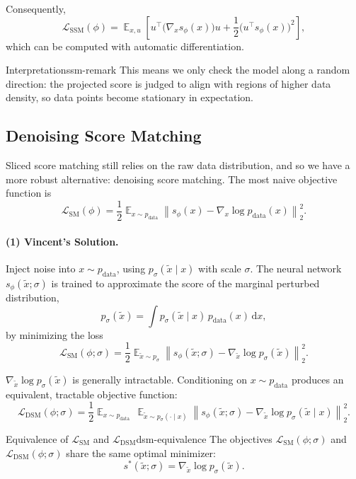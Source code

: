 \documentclass[11pt,a4paper]{article}
\newcommand{\wt}{\widetilde}
\renewcommand{\tilde}{\wt}
\renewcommand{\d}{\mathrm{d}}
\DeclareMathOperator*{\E}{\mathbb{E}}
\newcommand{\pdata}{p_{\mathrm{data}}}
\newcommand{\psigma}{p_{\sigma}}
\begin{document}
Consequently,
\[
\mathcal{L}_{\mathrm{SSM}}(\phi)
=
\E_{x,u}
\left[
u^\top\big(\nabla_x s_{\phi}(x)\big)u
+\frac12\big(u^\top s_{\phi}(x)\big)^2
\right],
\]
which can be computed with automatic differentiation.

\begin{remark}{Interpretation}{ssm-remark}
This means we only check the model along a random direction: the projected score is judged to align with regions of higher data density, so data points become stationary in expectation.
\end{remark}

\subsection{Denoising Score Matching}\label{subsec:dsm}

Sliced score matching still relies on the raw data distribution, and so we have a more robust alternative: denoising score matching. The most naive objective function is
\[
\mathcal{L}_{\mathrm{SM}}(\phi)
=\frac12 \E_{x\sim\pdata}
\left\|s_{\phi}(x)-\nabla_x\log \pdata(x)\right\|_2^2.
\]

\paragraph{(1) Vincent's Solution.}
Inject noise into $x\sim\pdata$, using $\psigma(\tilde x\mid x)$ with scale $\sigma$. The neural network $s_{\phi}(\tilde x;\sigma)$ is trained to approximate the score of the marginal perturbed distribution,
\[
\psigma(\tilde x)=\int \psigma(\tilde x\mid x)\,\pdata(x)\,\d x,
\]
by minimizing the loss
\[
\mathcal{L}_{\mathrm{SM}}(\phi;\sigma)
=\frac12\E_{\tilde x\sim\psigma}
\left\|s_{\phi}(\tilde x;\sigma)-\nabla_{\tilde x}\log\psigma(\tilde x)\right\|_2^2.
\]

$\nabla_{\tilde x}\log\psigma(\tilde x)$ is generally intractable. Conditioning on $x\sim\pdata$ produces an equivalent, tractable objective function:
\[
\mathcal{L}_{\mathrm{DSM}}(\phi;\sigma)
=\frac12\E_{x\sim\pdata}\,\E_{\tilde x\sim\psigma(\cdot\mid x)}
\left\|s_{\phi}(\tilde x;\sigma)-\nabla_{\tilde x}\log\psigma(\tilde x\mid x)\right\|_2^2.
\]

\begin{theorem}{Equivalence of $\mathcal{L}_{\mathrm{SM}}$ and $\mathcal{L}_{\mathrm{DSM}}$}{dsm-equivalence}
The objectives $\mathcal{L}_{\mathrm{SM}}(\phi;\sigma)$ and $\mathcal{L}_{\mathrm{DSM}}(\phi;\sigma)$ share the same optimal minimizer:
\[
s^*(\tilde x;\sigma)=\nabla_{\tilde x}\log\psigma(\tilde x).
\]
\end{theorem}
\end{document}
